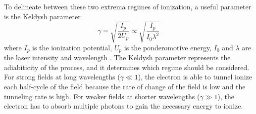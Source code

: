 To delineate between these two extrema regimes of ionization, a useful parameter is the Keldysh parameter
\begin{equation}
	\label{eqn:keldysh_param}
	\gamma=\sqrt{\frac{I_p}{2 U_p}}\propto\sqrt{\frac{I_p}{I_0 \lambda^2}}
\end{equation}
where $I_p$ is the ionization potential, $U_p$ is the ponderomotive energy, $I_0$ and $\lambda$ are the laser intensity and wavelength \cite{keldyshIonizationFieldStrong1965}.  The Keldysh parameter represents the adiabiticity of the process, and it determines which regime should be considered.  For strong fields at long wavelengths ($\gamma \ll 1$), the electron is able to tunnel ionize each half-cycle of the field because the rate of change of the field is low and the tunneling rate is high.  For weaker fields at shorter wavelengths ($\gamma \gg 1$), the electron has to absorb multiple photons to gain the necessary energy to ionize.

